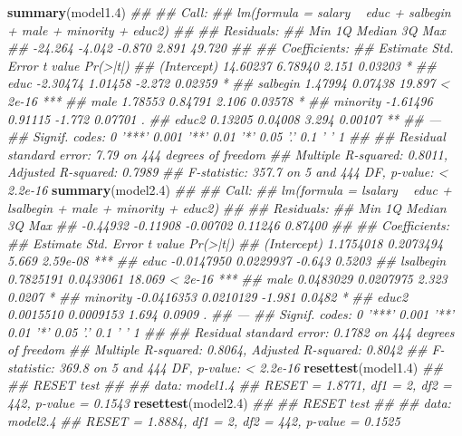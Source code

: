 \documentclass[
  10pt,
]{article}
\newenvironment{Shaded}{\begin{snugshade}}{\end{snugshade}}
\newcommand{\CommentTok}[1]{\textcolor[rgb]{0.56,0.35,0.01}{\textit{#1}}}
\newcommand{\FloatTok}[1]{\textcolor[rgb]{0.00,0.00,0.81}{#1}}
\newcommand{\KeywordTok}[1]{\textcolor[rgb]{0.13,0.29,0.53}{\textbf{#1}}}
\newcommand{\NormalTok}[1]{#1}
\begin{document}
\begin{Shaded}
\begin{Highlighting}[]
\KeywordTok{summary}\NormalTok{(model1}\FloatTok{.4}\NormalTok{)}
\CommentTok{## }
\CommentTok{## Call:}
\CommentTok{## lm(formula = salary ~ educ + salbegin + male + minority + educ2)}
\CommentTok{## }
\CommentTok{## Residuals:}
\CommentTok{##     Min      1Q  Median      3Q     Max }
\CommentTok{## -24.264  -4.042  -0.870   2.891  49.720 }
\CommentTok{## }
\CommentTok{## Coefficients:}
\CommentTok{##             Estimate Std. Error t value Pr(>|t|)    }
\CommentTok{## (Intercept) 14.60237    6.78940   2.151  0.03203 *  }
\CommentTok{## educ        -2.30474    1.01458  -2.272  0.02359 *  }
\CommentTok{## salbegin     1.47994    0.07438  19.897  < 2e-16 ***}
\CommentTok{## male         1.78553    0.84791   2.106  0.03578 *  }
\CommentTok{## minority    -1.61496    0.91115  -1.772  0.07701 .  }
\CommentTok{## educ2        0.13205    0.04008   3.294  0.00107 ** }
\CommentTok{## ---}
\CommentTok{## Signif. codes:  0 '***' 0.001 '**' 0.01 '*' 0.05 '.' 0.1 ' ' 1}
\CommentTok{## }
\CommentTok{## Residual standard error: 7.79 on 444 degrees of freedom}
\CommentTok{## Multiple R-squared:  0.8011, Adjusted R-squared:  0.7989 }
\CommentTok{## F-statistic: 357.7 on 5 and 444 DF,  p-value: < 2.2e-16}
\KeywordTok{summary}\NormalTok{(model2}\FloatTok{.4}\NormalTok{)}
\CommentTok{## }
\CommentTok{## Call:}
\CommentTok{## lm(formula = lsalary ~ educ + lsalbegin + male + minority + educ2)}
\CommentTok{## }
\CommentTok{## Residuals:}
\CommentTok{##      Min       1Q   Median       3Q      Max }
\CommentTok{## -0.44932 -0.11908 -0.00702  0.11246  0.87400 }
\CommentTok{## }
\CommentTok{## Coefficients:}
\CommentTok{##               Estimate Std. Error t value Pr(>|t|)    }
\CommentTok{## (Intercept)  1.1754018  0.2073494   5.669 2.59e-08 ***}
\CommentTok{## educ        -0.0147950  0.0229937  -0.643   0.5203    }
\CommentTok{## lsalbegin    0.7825191  0.0433061  18.069  < 2e-16 ***}
\CommentTok{## male         0.0483029  0.0207975   2.323   0.0207 *  }
\CommentTok{## minority    -0.0416353  0.0210129  -1.981   0.0482 *  }
\CommentTok{## educ2        0.0015510  0.0009153   1.694   0.0909 .  }
\CommentTok{## ---}
\CommentTok{## Signif. codes:  0 '***' 0.001 '**' 0.01 '*' 0.05 '.' 0.1 ' ' 1}
\CommentTok{## }
\CommentTok{## Residual standard error: 0.1782 on 444 degrees of freedom}
\CommentTok{## Multiple R-squared:  0.8064, Adjusted R-squared:  0.8042 }
\CommentTok{## F-statistic: 369.8 on 5 and 444 DF,  p-value: < 2.2e-16}
\KeywordTok{resettest}\NormalTok{(model1}\FloatTok{.4}\NormalTok{)}
\CommentTok{## }
\CommentTok{##  RESET test}
\CommentTok{## }
\CommentTok{## data:  model1.4}
\CommentTok{## RESET = 1.8771, df1 = 2, df2 = 442, p-value = 0.1543}
\KeywordTok{resettest}\NormalTok{(model2}\FloatTok{.4}\NormalTok{)}
\CommentTok{## }
\CommentTok{##  RESET test}
\CommentTok{## }
\CommentTok{## data:  model2.4}
\CommentTok{## RESET = 1.8884, df1 = 2, df2 = 442, p-value = 0.1525}
\end{Highlighting}
\end{Shaded}
\end{document}
